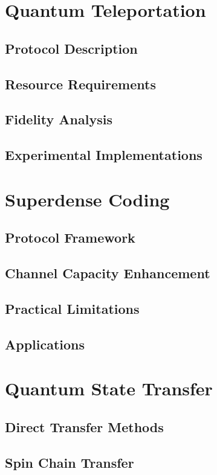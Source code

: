 \documentclass[12pt,a4paper]{book}
\begin{document}
\section{Quantum Teleportation}
\subsection{Protocol Description}
\subsection{Resource Requirements}
\subsection{Fidelity Analysis}
\subsection{Experimental Implementations}

\section{Superdense Coding}
\subsection{Protocol Framework}
\subsection{Channel Capacity Enhancement}
\subsection{Practical Limitations}
\subsection{Applications}

\section{Quantum State Transfer}
\subsection{Direct Transfer Methods}
\subsection{Spin Chain Transfer}
\end{document}
